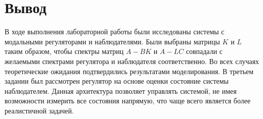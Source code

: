 
\FloatBarrier

\FloatBarrier


\section{Вывод}
В ходе выполнения лабораторной работы были исследованы системы с модальными регуляторами и наблюдателями.
Были выбраны матрицы $K$ и $L$ таким образом, чтобы спектры матриц $A - BK$ и $A - LC$ совпадали с желаемыми спектрами регулятора и наблюдателя соответственно.
Во всех случаях теоретические ожидания подтвердились результатами моделирования. В третьем задании был рассмотрен регулятор на основе оценки 
состояние системы наблюдателем. Данная архитектура позволяет управлять системой, не имея возможности измерить все состояния напрямую, что 
чаще всего является более реалистичной задачей.